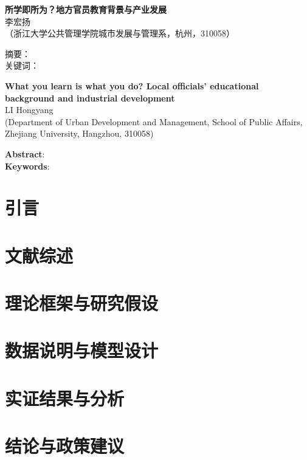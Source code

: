 \documentclass[a4paper,11pt, fontset=fandol]{ctexart}
\newcommand*{\TNR}{\CJKfamily{TNR}}
\newcommand{\sanhao}{\fontsize{15.75pt}{\baselineskip}\selectfont}
\newcommand{\sihao}{\fontsize{14pt}{\baselineskip}\selectfont}
\newcommand{\wuhao}{\fontsize{10.5pt}{\baselineskip}\selectfont}
\begin{document}
\begin{center}
\textbf{\sanhao 所学即所为？地方官员教育背景与产业发展} \\
\kaishu \wuhao 李宏扬 \\
\songti （浙江大学公共管理学院城市发展与管理系，杭州，310058）\\
\end{center}
\heiti \noindent 摘要： \songti \\
\heiti \noindent 关键词：\songti 


\begin{center}
\textbf{\TNR\sihao What you learn is what you do? Local officials' educational background and industrial development} \\
\wuhao LI Hongyang \\
(Department of Urban Development and Management, School of Public Affairs, Zhejiang University, Hangzhou, 310058) 
\end{center}
\noindent \textbf{Abstract}: \\
\noindent \textbf{Keywords}: 

\newpage
\tableofcontents
\newpage
\songti

\section{引言}

\section{文献综述}

\section{理论框架与研究假设}

\section{数据说明与模型设计}

\section{实证结果与分析}

\section{结论与政策建议}
\end{document}
